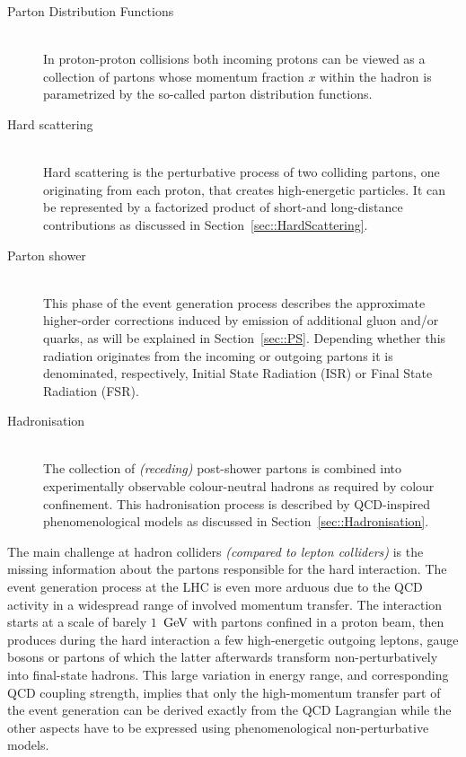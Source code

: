 \begin{myindentpar}
  \begin{description}
    \item[Parton Distribution Functions] \hfill \\
      In proton-proton collisions both incoming protons can be viewed as a collection of partons whose momentum fraction $x$ within the hadron is parametrized by the so-called parton distribution functions.
    \item[Hard scattering] \hfill \\
      Hard scattering is the perturbative process of two colliding partons, one originating from each proton, that creates high-energetic particles. It can be represented by a factorized product of short-and long-distance contributions as discussed in Section~\ref{sec::HardScattering}.
    \item[Parton shower] \hfill \\
      This phase of the event generation process describes the approximate higher-order corrections induced by emission of additional gluon and/or quarks, as will be explained in Section~\ref{sec::PS}. Depending whether this radiation originates from the incoming or outgoing partons it is denominated, respectively, Initial State Radiation (ISR) or Final State Radiation (FSR).
    \item[Hadronisation] \hfill \\
      The collection of \textit{(receding)} post-shower partons is combined into experimentally observable colour-neutral hadrons as required by colour confinement. This hadronisation process is described by QCD-inspired phenomenological models as discussed in Section~\ref{sec::Hadronisation}.
  \end{description}
\end{myindentpar}

The main challenge at hadron colliders \textit{(compared to lepton colliders)} is the missing information about the partons responsible for the hard interaction. 
The event generation process at the LHC is even more arduous due to the QCD activity in a widespread range of involved momentum transfer. %
The interaction starts at a scale of barely $1$ $\, \mathrm{GeV}$ with partons confined in a proton beam, then produces during the hard interaction a few high-energetic outgoing leptons, gauge bosons or partons of which the latter afterwards transform non-perturbatively into final-state hadrons. This large variation in energy range, and corresponding QCD coupling strength, implies that only the high-momentum transfer part of the event generation can be derived exactly from the QCD Lagrangian while the other aspects have to be expressed using phenomenological non-perturbative models.


